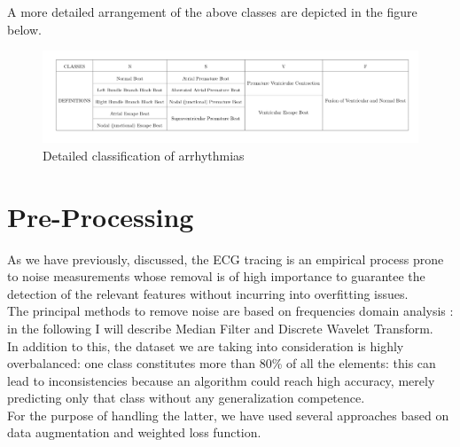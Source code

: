 \documentclass[LaM,binding=0.6cm]{sapthesis}
\begin{document}
A more detailed arrangement of the above classes are depicted in the figure below.
\begin{figure}[H]  \centering
    \includegraphics[width=150mm,scale=0.7]{allclass}
    \caption{Detailed classification of arrhythmias }
    \label{fig:allclass}
\end{figure}

\chapter{Pre-Processing}
As we have previously, discussed, the ECG tracing is an empirical process prone to noise measurements whose removal is of high importance to guarantee the detection of the relevant features without incurring into overfitting issues.\\The principal methods to remove noise are based on frequencies domain analysis : in the following I will describe Median Filter and Discrete Wavelet Transform.\\In addition to this, the dataset we are taking into consideration is highly overbalanced: one class constitutes more than 80\% of all the elements: this can lead to inconsistencies because an algorithm could reach high accuracy, merely predicting only that class without any generalization competence.\\For the purpose of handling the latter, we have used several approaches based on data augmentation and weighted loss function. 
\end{document}
